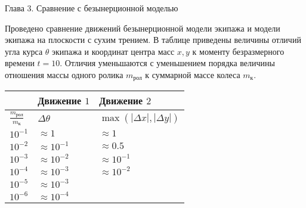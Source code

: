 \begin{frame}{Глава 3. Сравнение с безынерционной моделью}
    
    Проведено сравнение движений безынерционной модели экипажа и модели экипажа на плоскости с сухим трением.
    В таблице приведены величины отличий угла курса $\theta$ экипажа и координат центра масс $x, y$ к моменту безразмерного времени $t = 10$.
    Отличия уменьшаются с уменьшением порядка величины отношения массы одного ролика $m_{\text{рол}}$ к суммарной массе колеса $m_{\text{к}}$.
    
    \vspace{-12pt}
    \begin{table}[]
        \begin{tabular}{l|l|l}
         & Движение $1$ & Движение $2$ \\ \hline
        $\frac{m_{\text{рол}}}{m_{\text{к}}}$ &
        $\Delta \theta$ &
        $\max(|\Delta x|, |\Delta y|)$ \\ \hline
        $10^{-1}$ & $\approx 1$       & $\approx 1$       \\
        $10^{-2}$ & $\approx 10^{-1}$ & $\approx 0.5$     \\
        $10^{-3}$ & $\approx 10^{-2}$ & $\approx 10^{-1}$ \\
        $10^{-4}$ & $\approx 10^{-3}$ & $\approx 10^{-2}$ \\
        $10^{-5}$ & $\approx 10^{-3}$ &                   \\
        $10^{-6}$ & $\approx 10^{-4}$ & 
        \end{tabular}
    \end{table}
    
\end{frame}